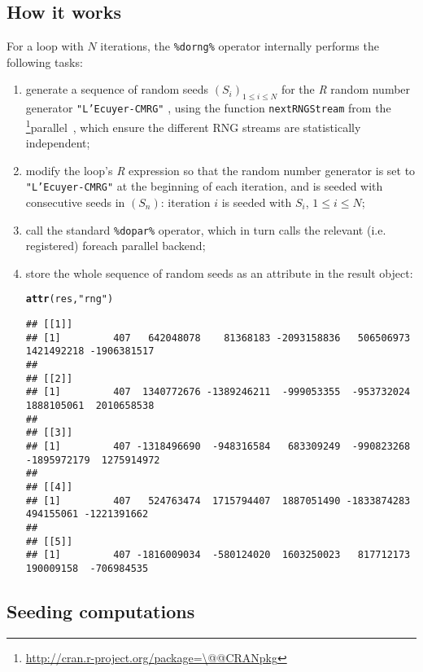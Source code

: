 \documentclass[a4paper,12pt]{article}\usepackage{graphicx, color}
\makeatletter
\newcommand{\hlfunctioncall}[1]{\textcolor[rgb]{0.501960784313725,0,0.329411764705882}{\textbf{#1}}}%
\newcommand{\hlstring}[1]{\textcolor[rgb]{0.6,0.6,1}{#1}}%
\newenvironment{kframe}{%
 \def\at@end@of@kframe{}%
 \ifinner\ifhmode%
  \def\at@end@of@kframe{\end{minipage}}%
  \begin{minipage}{\columnwidth}%
 \fi\fi%
 \def\FrameCommand##1{\hskip\@totalleftmargin \hskip-\fboxsep
 \colorbox{shadecolor}{##1}\hskip-\fboxsep
     \hskip-\linewidth \hskip-\@totalleftmargin \hskip\columnwidth}%
 \MakeFramed {\advance\hsize-\width
   \@totalleftmargin\z@ \linewidth\hsize
   \@setminipage}}%
 {\par\unskip\endMakeFramed%
 \at@end@of@kframe}
\newenvironment{knitrout}{}{} %
\renewenvironment{knitrout}{\begin{footnotesize}}{\end{footnotesize}}
\let\proglang=\textit
\let\code=\texttt
\newcommand{\pkgname}[1]{\textit{#1}\xspace}
\newcommand{\CRANurl}[1]{\url{http://cran.r-project.org/package=#1}}
\def\CRANpkg{\@ifstar\@CRANpkg\@@CRANpkg}
\def\@CRANpkg#1{\href{http://cran.r-project.org/package=#1}{\pkgname{#1}}\footnote{\CRANurl{#1}}}
\def\@@CRANpkg#1{\href{http://cran.r-project.org/package=#1}{\pkgname{#1}} package\footnote{\CRANurl{#1}}}
\newcommand{\citeCRANpkg}[1]{\CRANpkg{#1}~\cite{#1}}
\makeatother
\begin{document}
\subsection{How it works}
For a loop with $N$ iterations, the \code{\%dorng\%} operator internally
performs the following tasks:
\begin{enumerate}
  \item generate a sequence of random seeds $(S_i)_{1\leq i\leq N}$ for the \proglang{R} random number
  generator \code{"L'Ecuyer-CMRG"} \cite{Lecuyer1999}, using
  the function \code{nextRNGStream} from the \citeCRANpkg{parallel},
  which ensure the different RNG streams are statistically independent;
  \item modify the loop's \proglang{R} expression so that the random number
  generator is set to \code{"L'Ecuyer-CMRG"} at the beginning of each
  iteration, and is seeded with consecutive seeds in $(S_n)$: iteration $i$ is
  seeded with $S_i$, $1\leq i\leq N$;
  \item call the standard \code{\%dopar\%} operator, which in turn
  calls the relevant (i.e. registered) foreach parallel backend;
  \item store the whole sequence of random seeds as an attribute in the result
  object:
\begin{knitrout}
\color{fgcolor}\begin{kframe}
\begin{alltt}
\hlfunctioncall{attr}(res, \hlstring{"rng"})
\end{alltt}
\begin{verbatim}
## [[1]]
## [1]         407   642048078    81368183 -2093158836   506506973  1421492218 -1906381517
## 
## [[2]]
## [1]         407  1340772676 -1389246211  -999053355  -953732024  1888105061  2010658538
## 
## [[3]]
## [1]         407 -1318496690  -948316584   683309249  -990823268 -1895972179  1275914972
## 
## [[4]]
## [1]         407   524763474  1715794407  1887051490 -1833874283   494155061 -1221391662
## 
## [[5]]
## [1]         407 -1816009034  -580124020  1603250023   817712173   190009158  -706984535
\end{verbatim}
\end{kframe}
\end{knitrout}

\end{enumerate}

\subsection{Seeding computations}
\end{document}
